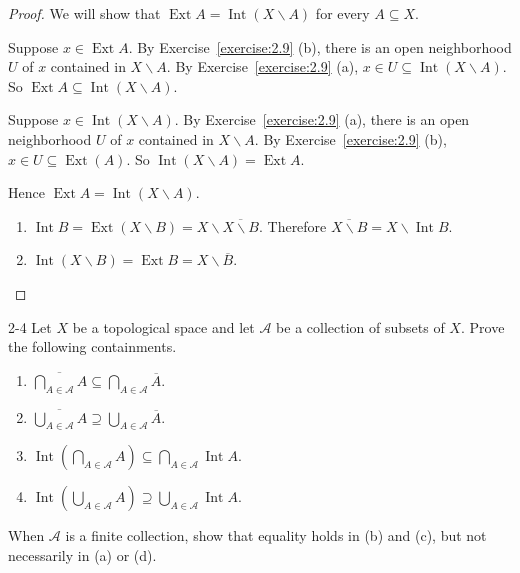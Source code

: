 \begin{proof}
	We will show that $\operatorname{Ext}A = \operatorname{Int}(X\smallsetminus A)$ for every $A\subseteq X$.

	Suppose $x\in \operatorname{Ext}A$. By Exercise~\ref{exercise:2.9} (b), there is an open neighborhood $U$ of $x$ contained in $X\smallsetminus A$. By Exercise~\ref{exercise:2.9} (a), $x\in U\subseteq \operatorname{Int}(X\smallsetminus A)$. So $\operatorname{Ext}A \subseteq \operatorname{Int}(X\smallsetminus A)$.

	Suppose $x\in \operatorname{Int}(X\smallsetminus A)$. By Exercise~\ref{exercise:2.9} (a), there is an open neighborhood $U$ of $x$ contained in $X\smallsetminus A$. By Exercise~\ref{exercise:2.9} (b), $x\in U\subseteq \operatorname{Ext}(A)$. So $\operatorname{Int}(X\smallsetminus A) = \operatorname{Ext} A$.

	Hence $\operatorname{Ext}A = \operatorname{Int}(X\smallsetminus A)$.
	\begin{enumerate}[label={(\alph*)}]
		\item $\operatorname{Int}B = \operatorname{Ext}(X\smallsetminus B) = X\smallsetminus\overline{X\smallsetminus B}$. Therefore $\overline{X\smallsetminus B} = X\smallsetminus\operatorname{Int}B$.
		\item $\operatorname{Int}(X\smallsetminus B) = \operatorname{Ext}B = X\smallsetminus\overline{B}$.
	\end{enumerate}
\end{proof}

\begin{problem}{2-4}\label{problem:2-4}
Let $X$ be a topological space and let $\mathscr{A}$ be a collection of subsets of $X$. Prove
the following containments.

\begin{enumerate}[label={(\alph*)}]
	\item $\displaystyle\overline{\bigcap_{A\in\mathscr{A}}A} \subseteq \bigcap_{A\in\mathscr{A}}\overline{A}$.
	\item $\displaystyle\overline{\bigcup_{A\in\mathscr{A}}A} \supseteq \bigcup_{A\in\mathscr{A}}\overline{A}$.
	\item $\displaystyle\operatorname{Int}\left(\bigcap_{A\in\mathscr{A}}A\right)\subseteq \bigcap_{A\in\mathscr{A}}\operatorname{Int}A$.
	\item $\displaystyle\operatorname{Int}\left(\bigcup_{A\in\mathscr{A}}A\right)\supseteq \bigcup_{A\in\mathscr{A}}\operatorname{Int}A$.
\end{enumerate}

When $\mathscr{A}$ is a finite collection, show that equality holds in (b) and (c), but not necessarily in (a) or (d).
\end{problem}

